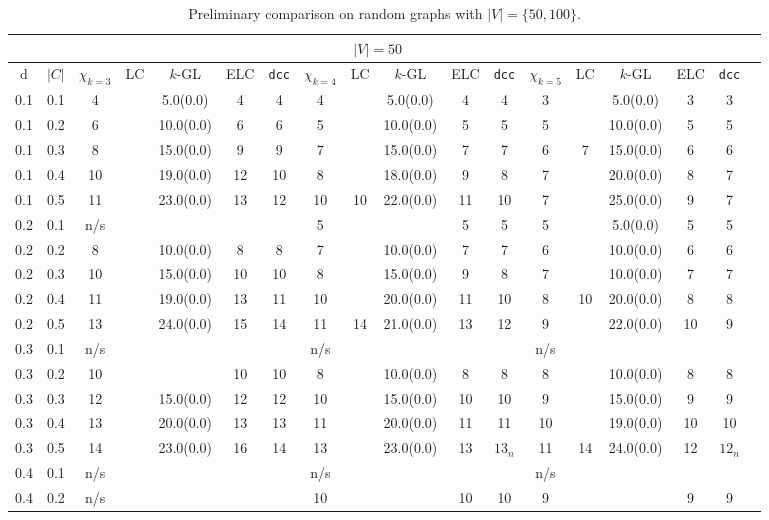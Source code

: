 \documentclass[10pt]{article}
\begin{document}
\begin{table}
  \small
  \centering
    \caption{Preliminary comparison on random graphs with $|V| = \{50, 100\}$.}
  \begin{tabular}{|c|c|c|c|c|c|c||c|c|c|c|c||c|c|c|c|c|c|} \hline
  	\multicolumn{17}{|c|}{$|V| = 50$} \\
  	\hline
	d&$|C|$&$\chi _{k=3}$& LC & $k$-GL & ELC& \texttt{dcc} & $\chi_{k = 4}$ & LC & $k$-GL & ELC & \texttt{dcc} & $\chi_{k=5}$&LC&$k$-GL&ELC&\texttt{dcc}\\ 
	\hline
	0.1&0.1&4&&5.0(0.0) & 4& 4 & 4& & 5.0(0.0) & 4 & 4 & 3 &&5.0(0.0)&3&3\\ 
	\hline
	0.1&0.2&6&  & 10.0(0.0) & 6& 6 & 5 &  & 10.0(0.0) & 5 & 5 & 5&&10.0(0.0)&5&5\\ 
	\hline
	0.1&0.3&8&  & 15.0(0.0) & 9& 9 & 7&  & 15.0(0.0) & 7 & 7 & 6&7&15.0(0.0)&6&6\\ 
	\hline
	0.1&0.4&10& & 19.0(0.0) & 12& 10 &8 &  & 18.0(0.0) & 9 & 8 & 7&&20.0(0.0)&8&7\\ 
	\hline
	0.1&0.5&11& & 23.0(0.0) & 13& 12 &10& 10 & 22.0(0.0) & 11 & 10 & 7&&25.0(0.0)&9&7\\ 
	\hline
	0.2&0.1&n/s&  & & & &5&  &  & 5 & 5 & 5&&5.0(0.0)&5&5\\ 
	\hline
	0.2&0.2&8&  & 10.0(0.0) & 8& 8 &7 &  & 10.0(0.0) & 7 & 7 & 6&&10.0(0.0)&6&6\\ 
	\hline
	0.2&0.3&10&  & 15.0(0.0) & 10& 10 &8 &  &15.0(0.0)& 9 & 8 & 7&&10.0(0.0)&7&7\\ 
	\hline
	0.2&0.4&11&  & 19.0(0.0) & 13& 11 & 10 &  & 20.0(0.0) & 11 & 10 & 8&10&20.0(0.0)&8&8\\ 
	\hline
	0.2&0.5&13&  & 24.0(0.0) & 15& 14 & 11& 14 & 21.0(0.0) & 13 & 12 & 9&&22.0(0.0)&10&9\\ 
	\hline
	0.3&0.1&n/s&  & & &  & n/s&  &  &  &  & n/s &&& & \\ 
	\hline
	0.3&0.2&10&  & & 10& 10 & 8 &  & 10.0(0.0)& 8 & 8 & 8&&10.0(0.0)&8&8\\ 
	\hline
	0.3&0.3&12&  & 15.0(0.0) & 12& 12 & 10 &  & 15.0(0.0) & 10 & 10 & 9&&15.0(0.0)&9&9\\ 
	\hline
	0.3&0.4&13&  & 20.0(0.0) & 13& 13 & 11&  & 20.0(0.0) & 11 & 11 & 10&&19.0(0.0)&10&10\\ 
	\hline
	0.3&0.5&14&  & 23.0(0.0) & 16& 14 & 13&  & 23.0(0.0) & 13 & $13_n$ & 11&14&24.0(0.0)&12&$12_n$\\ 
	\hline
	0.4&0.1&n/s&  &  & &  & n/s&  &  &  &  & n/s&&&&\\ 
	\hline
	0.4&0.2&n/s&  &  & &  & 10 &  && 10 & 10 & 9&&&9&9\\ 

\end{tabular}
\end{table}
\end{document}
